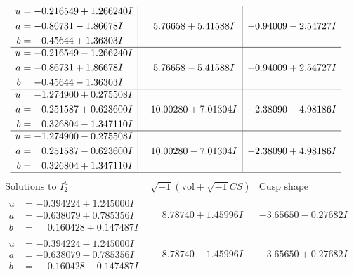 \documentclass[1p]{elsarticle_modified}
\theoremstyle{definition}
\newcommand{\I}{\sqrt{-1}}
\begin{document}
$$\begin{array}{c|c|c}
\begin{aligned}
u &= -0.216549 + 1.266240 I \\
a &= -0.86731 - 1.86678 I \\
b &= -0.45644 + 1.36303 I\end{aligned}
 & \phantom{-}5.76658 + 5.41588 I & -0.94009 - 2.54727 I \\ \hline\begin{aligned}
u &= -0.216549 - 1.266240 I \\
a &= -0.86731 + 1.86678 I \\
b &= -0.45644 - 1.36303 I\end{aligned}
 & \phantom{-}5.76658 - 5.41588 I & -0.94009 + 2.54727 I \\ \hline\begin{aligned}
u &= -1.274900 + 0.275508 I \\
a &= \phantom{-}0.251587 + 0.623600 I \\
b &= \phantom{-}0.326804 - 1.347110 I\end{aligned}
 & \phantom{-}10.00280 + 7.01304 I & -2.38090 - 4.98186 I \\ \hline\begin{aligned}
u &= -1.274900 - 0.275508 I \\
a &= \phantom{-}0.251587 - 0.623600 I \\
b &= \phantom{-}0.326804 + 1.347110 I\end{aligned}
 & \phantom{-}10.00280 - 7.01304 I & -2.38090 + 4.98186 I\\
 \hline 
 \end{array}$$\newpage$$\begin{array}{c|c|c}  
\text{Solutions to }I^u_{2}& \I (\text{vol} + \sqrt{-1}CS) & \text{Cusp shape}\\
 \hline 
\begin{aligned}
u &= -0.394224 + 1.245000 I \\
a &= -0.638079 + 0.785356 I \\
b &= \phantom{-}0.160428 + 0.147487 I\end{aligned}
 & \phantom{-}8.78740 + 1.45996 I & -3.65650 - 0.27682 I \\ \hline\begin{aligned}
u &= -0.394224 - 1.245000 I \\
a &= -0.638079 - 0.785356 I \\
b &= \phantom{-}0.160428 - 0.147487 I\end{aligned}
 & \phantom{-}8.78740 - 1.45996 I & -3.65650 + 0.27682 I \\ \hline\begin{aligned}

\end{aligned}
\end{array}$$
\end{document}

